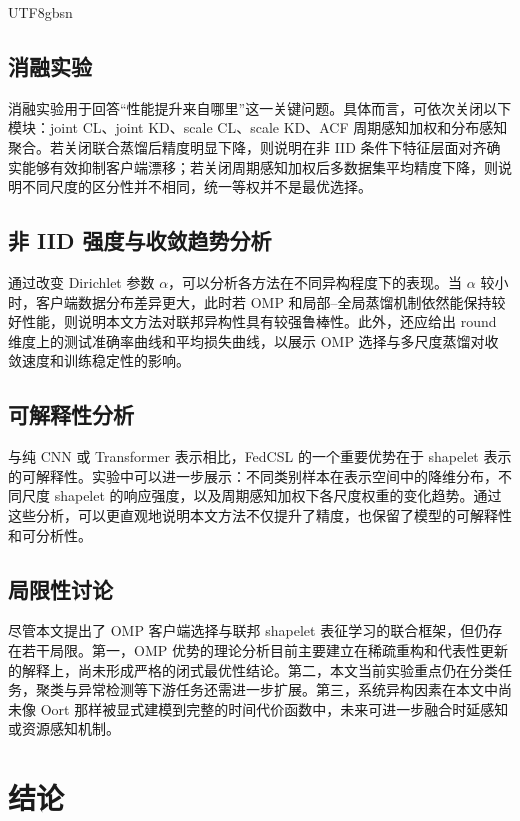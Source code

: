 \documentclass{article}
\begin{document}
\begin{CJK*}{UTF8}{gbsn}
\subsection{消融实验}

消融实验用于回答“性能提升来自哪里”这一关键问题。具体而言，可依次关闭以下模块：joint CL、joint KD、scale CL、scale KD、ACF 周期感知加权和分布感知聚合。若关闭联合蒸馏后精度明显下降，则说明在非 IID 条件下特征层面对齐确实能够有效抑制客户端漂移；若关闭周期感知加权后多数据集平均精度下降，则说明不同尺度的区分性并不相同，统一等权并不是最优选择。

\subsection{非 IID 强度与收敛趋势分析}

通过改变 Dirichlet 参数 $\alpha$，可以分析各方法在不同异构程度下的表现。当 $\alpha$ 较小时，客户端数据分布差异更大，此时若 OMP 和局部--全局蒸馏机制依然能保持较好性能，则说明本文方法对联邦异构性具有较强鲁棒性。此外，还应给出 round 维度上的测试准确率曲线和平均损失曲线，以展示 OMP 选择与多尺度蒸馏对收敛速度和训练稳定性的影响。

\subsection{可解释性分析}

与纯 CNN 或 Transformer 表示相比，FedCSL 的一个重要优势在于 shapelet 表示的可解释性。实验中可以进一步展示：不同类别样本在表示空间中的降维分布，不同尺度 shapelet 的响应强度，以及周期感知加权下各尺度权重的变化趋势。通过这些分析，可以更直观地说明本文方法不仅提升了精度，也保留了模型的可解释性和可分析性。

\subsection{局限性讨论}

尽管本文提出了 OMP 客户端选择与联邦 shapelet 表征学习的联合框架，但仍存在若干局限。第一，OMP 优势的理论分析目前主要建立在稀疏重构和代表性更新的解释上，尚未形成严格的闭式最优性结论。第二，本文当前实验重点仍在分类任务，聚类与异常检测等下游任务还需进一步扩展。第三，系统异构因素在本文中尚未像 Oort 那样被显式建模到完整的时间代价函数中，未来可进一步融合时延感知或资源感知机制。

\section{结论}


\end{CJK*}
\end{document}
